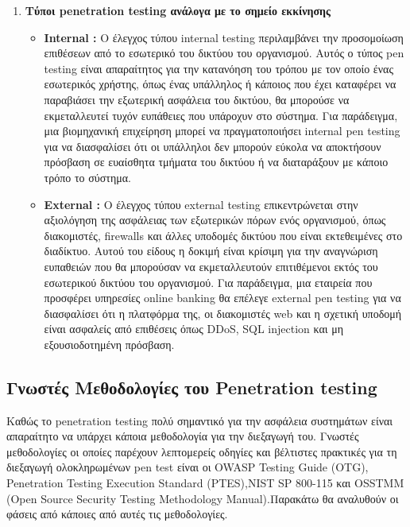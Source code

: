 {\begin{enumerate}
\begin{itemize}
    \end{itemize}
    \item{\textbf{ Τύποι \lt penetration testing \gt ανάλογα με το σημείο εκκίνησης}}
    \begin{itemize}
        \item \textbf{\lt Internal :} \gt Ο έλεγχος τύπου \lt internal  testing \gt περιλαμβάνει την προσομοίωση επιθέσεων από το εσωτερικό του δικτύου του οργανισμού. Αυτός ο τύπος \lt pen testing \gt είναι απαραίτητος για την κατανόηση του τρόπου με τον οποίο ένας εσωτερικός χρήστης, όπως ένας υπάλληλος ή κάποιος που έχει καταφέρει να παραβιάσει την εξωτερική ασφάλεια του δικτύου, θα μπορούσε να εκμεταλλευτεί τυχόν ευπάθειες που υπάροχυν στο σύστημα. Για παράδειγμα, μια βιομηχανική επιχείρηση μπορεί να πραγματοποιήσει \lt internal pen testing \gt για να διασφαλίσει ότι οι υπάλληλοι δεν μπορούν εύκολα να αποκτήσουν πρόσβαση σε ευαίσθητα τμήματα του δικτύου ή να διαταράξουν με κάποιο τρόπο το σύστημα.
        \item \textbf{\lt External :} \gt Ο έλεγχος τύπου \lt external  testing \gt  επικεντρώνεται στην αξιολόγηση της ασφάλειας των εξωτερικών πόρων ενός οργανισμού, όπως διακομιστές, \lt firewalls \gt και άλλες υποδομές δικτύου που είναι εκτεθειμένες στο διαδίκτυο. Αυτού του είδους η δοκιμή είναι κρίσιμη για την αναγνώριση ευπαθειών που θα μπορούσαν να εκμεταλλευτούν επιτιθέμενοι εκτός του εσωτερικού δικτύου του οργανισμού. Για παράδειγμα, μια  εταιρεία που προσφέρει υπηρεσίες \lt online banking \gt  θα επέλεγε  \lt external pen testing \gt  για να διασφαλίσει ότι η πλατφόρμα της, οι διακομιστές web και η σχετική υποδομή είναι ασφαλείς από επιθέσεις όπως \lt DDoS, SQL injection \gt και μη εξουσιοδοτημένη πρόσβαση.
    \end{itemize}
\end{enumerate}
}
\subsection{\gt Γνωστές Μεθοδολογίες του \lt Penetration testing}
\hspace*{2em}Καθώς το \lt penetration testing  πολύ σημαντικό για την ασφάλεια συστημάτων είναι απαραίτητο να υπάρχει κάποια μεθοδολογία για την διεξαγωγή του. Γνωστές μεθοδολογίες οι οποίες παρέχουν λεπτομερείς οδηγίες και βέλτιστες πρακτικές για τη διεξαγωγή ολοκληρωμένων \lt pen test \gt είναι οι \lt OWASP Testing Guide (OTG), Penetration Testing Execution Standard (PTES),NIST SP 800-115 και \lt OSSTMM (Open Source Security Testing Methodology Manual).Παρακάτω θα αναλυθούν οι φάσεις από κάποιες από αυτές τις μεθοδολογίες.

